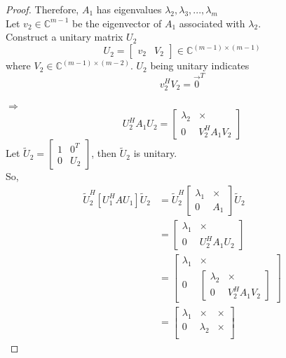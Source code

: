 \begin{multicols}{2}
\begin{proof}
    Therefore, $A_1$ has eigenvalues $\lambda_2,\lambda_3,...,\lambda_m$ \\
    Let $v_2\in\mathbb{C}^{m-1}$ be the eigenvector of $A_1$ associated with $\lambda_2$. \\
    Construct a unitary matrix $U_2$
    \[
        U_2 = \begin{bmatrix}v_2 & V_2\end{bmatrix} \in\mathbb{C}^{(m-1)\times (m-1)} 
    \]
    where $V_2\in\mathbb{C}^{(m-1)\times (m-2)}$. $U_2$ being unitary indicates \[v_2^HV_2=\overrightarrow{0}^T\]\\ 
    $\Longrightarrow$ 
    \[
        U_2^HA_1U_2 = \begin{bmatrix}
            \lambda_2 & \times  \\
            0 & V_2^HA_1V_2
        \end{bmatrix}
    \]
    Let $\tilde{U}_2=\begin{bmatrix}
        1 & 0^T \\ 0 & U_2
    \end{bmatrix}$, then $\tilde{U}_2$ is unitary. \\
    So,
    \[
        \begin{array}{ll}
            \tilde{U}_2^H[U_1^HAU_1]\tilde{U}_2 & = \tilde{U}_2^H \begin{bmatrix}
                \lambda_1 & \times \\
                0 & A_1
            \end{bmatrix} \tilde{U}_2 \\
        & = \begin{bmatrix}
            \lambda_1 & \times \\
            0 & U_2^HA_1U_2
        \end{bmatrix} \\
        & = \begin{bmatrix}
            \lambda_1 & \times \\
            0 & \begin{bmatrix}
                \lambda_2 & \times  \\
                0 & V_2^HA_1V_2
                \end{bmatrix}
            \end{bmatrix} \\
        & = \begin{bmatrix}
            \lambda_1 & \times    & \times \\
            0         & \lambda_2 & \times \\

\end{bmatrix}
\end{array}\]
\end{proof}
\end{multicols}
